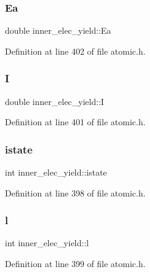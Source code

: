 \subsubsection{\texorpdfstring{Ea}{Ea}}
{\footnotesize\ttfamily double inner\+\_\+elec\+\_\+yield\+::\+Ea}



Definition at line 402 of file atomic.\+h.

\mbox{\label{structinner__elec__yield_a92b11e501d7ead3316b2ec82a10b53c8}} 
\subsubsection{\texorpdfstring{I}{I}}
{\footnotesize\ttfamily double inner\+\_\+elec\+\_\+yield\+::I}



Definition at line 401 of file atomic.\+h.

\mbox{\label{structinner__elec__yield_a61f5359ceb8e8e5c0a5e2f75b8f19cf3}} 
\subsubsection{\texorpdfstring{istate}{istate}}
{\footnotesize\ttfamily int inner\+\_\+elec\+\_\+yield\+::istate}



Definition at line 398 of file atomic.\+h.

\mbox{\label{structinner__elec__yield_ae91eb333576f62f1dcbfe9d4743da47c}} 
\subsubsection{\texorpdfstring{l}{l}}
{\footnotesize\ttfamily int inner\+\_\+elec\+\_\+yield\+::l}



Definition at line 399 of file atomic.\+h.

